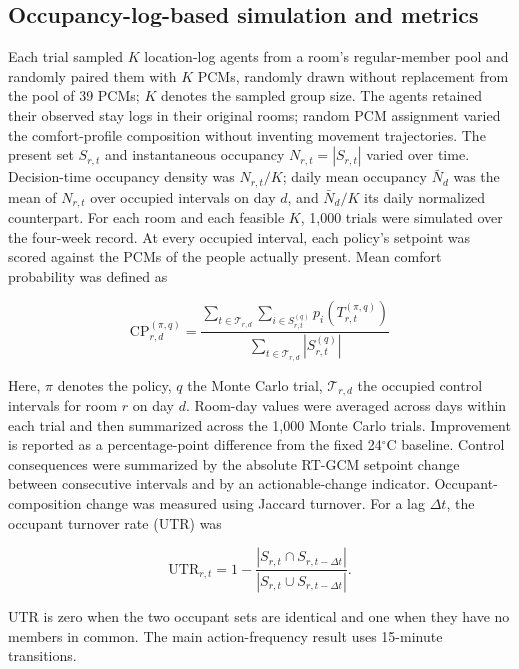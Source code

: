 \subsection{Occupancy-log-based simulation and metrics}
Each trial sampled $K$ location-log agents from a room's regular-member
pool and randomly paired them with $K$ PCMs, randomly drawn without replacement from the pool of 39 PCMs; $K$ denotes the sampled
group size.
The agents retained their observed stay logs in their original rooms; random PCM assignment varied the comfort-profile composition without inventing movement trajectories.
The present set $S_{r,t}$ and instantaneous occupancy $N_{r,t}=|S_{r,t}|$ varied over time.
Decision-time occupancy density was $N_{r,t}/K$; daily mean occupancy $\bar N_d$ was the mean of $N_{r,t}$ over occupied intervals on day $d$, and $\bar N_d/K$ its daily normalized counterpart.
For each room and each feasible $K$, 1,000 trials were simulated over the four-week record.
At every occupied interval, each policy's setpoint was scored against the PCMs of the people actually present.
Mean comfort probability was defined as

\begin{equation}
 \mathrm{CP}_{r,d}^{(\pi,q)}
 =\frac{\displaystyle\sum_{t\in\mathcal{T}_{r,d}}
       \sum_{i\in S_{r,t}^{(q)}}p_i\!\left(T_{r,t}^{(\pi,q)}\right)}
      {\displaystyle\sum_{t\in\mathcal{T}_{r,d}}\left|S_{r,t}^{(q)}\right|}
 \label{eq:comfort_metric}
\end{equation}

Here, $\pi$ denotes the policy, $q$ the Monte Carlo trial, $\mathcal{T}_{r,d}$ the occupied control intervals for room $r$ on day $d$.
Room-day values were averaged across days within each trial and then summarized across the 1,000 Monte Carlo trials.
Improvement is reported as a percentage-point difference from the fixed 24$^\circ$C baseline.
Control consequences were summarized by the absolute RT-GCM setpoint change between consecutive intervals and by an actionable-change indicator.
Occupant-composition change was measured using Jaccard turnover.
For a lag $\Delta t$, the occupant turnover rate (UTR) was

\begin{equation}
 \mathrm{UTR}_{r,t}=1-\frac{|S_{r,t}\cap S_{r,t-\Delta t}|}
 {|S_{r,t}\cup S_{r,t-\Delta t}|}.
 \label{eq:utr}
\end{equation}

UTR is zero when the two occupant sets are identical and one when they have no members in common.
The main action-frequency result uses 15-minute transitions.
